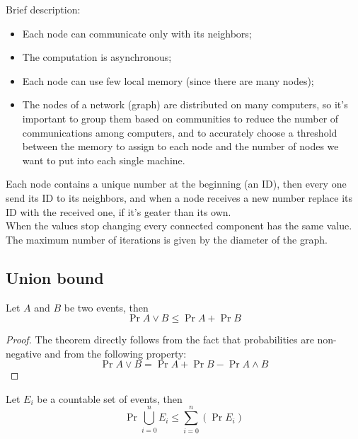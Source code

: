 Brief description:
\begin{itemize}
    \item Each node can communicate only with its neighbors;
    \item The computation is asynchronous;
    \item Each node can use few local memory (since there are many nodes);
    \item The nodes of a network (graph) are distributed on many computers, so it's important to group them based on communities to reduce the number of communications among computers, and to accurately choose a threshold between the memory to assign to each node and the number of nodes we want to put into each single machine.
\end{itemize}

\begin{ex}
    Each node contains a unique number at the beginning (an ID), then every one send its ID to its neighbors, and when a node receives a new number replace its ID with the received one, if it's geater than its own. \\
    When the values stop changing every connected component has the same value.
    The maximum number of iterations is given by the diameter of the graph.
\end{ex}


\subsection{Union bound}

\begin{defn}
    Let $A$ and $B$ be two events, then
    \begin{equation}\label{eq:union-bound}
        \Pr{A \vee B} \leq \Pr{A} + \Pr{B}
    \end{equation}
\end{defn}

\begin{proof}
    The theorem directly follows from the fact that probabilities are non-negative and from the following property:
    \begin{equation}\label{eq:prob-or}
        \Pr{A \vee B} = \Pr{A} + \Pr{B} - \Pr{A \wedge B}
    \end{equation}
\end{proof}

\begin{defn}
    Let $E_i$ be a countable set of events, then
    \begin{equation}\label{eq:union-bound-gen}
        \Pr{\bigcup_{i=0}^n E_i} \leq \sum_{i=0}^{n}(\Pr{E_i})
    \end{equation}
\end{defn}

